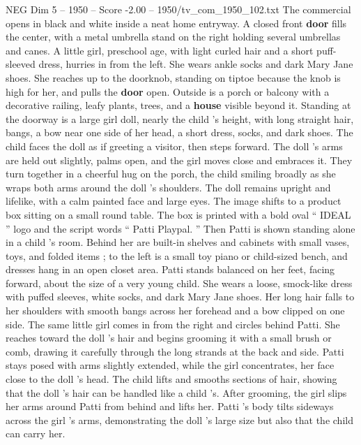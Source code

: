 \begin{textsample}{NEG Dim 5 – 1950 – Score -2.00 – 1950/tv\_com\_1950\_102.txt}  \label{ex:f5_neg_024}
The commercial opens in black and white inside a neat home entryway.
A closed front \textbf{door} fills the center, with a metal umbrella stand on the right holding several umbrellas and canes.
A little girl, preschool age, with light curled hair and a short puff-sleeved dress, hurries in from the left.
She wears ankle socks and dark Mary Jane shoes.
She reaches up to the doorknob, standing on tiptoe because the knob is high for her, and pulls the \textbf{door} open.
Outside is a porch or balcony with a decorative railing, leafy plants, trees, and a \textbf{house} visible beyond it.
Standing at the doorway is a large girl doll, nearly the child ’s height, with long straight hair, bangs, a bow near one side of her head, a short dress, socks, and dark shoes.
The child faces the doll as if greeting a visitor, then steps forward.
The doll ’s arms are held out slightly, palms open, and the girl moves close and embraces it.
They turn together in a cheerful hug on the porch, the child smiling broadly as she wraps both arms around the doll ’s shoulders.
The doll remains upright and lifelike, with a calm painted face and large eyes.
The image shifts to a product box sitting on a small round table.
The box is printed with a bold oval “ IDEAL ” logo and the script words “ Patti Playpal. ” Then Patti is shown standing alone in a child ’s room.
Behind her are built-in shelves and cabinets with small vases, toys, and folded items ; to the left is a small toy piano or child-sized bench, and dresses hang in an open closet area.
Patti stands balanced on her feet, facing forward, about the size of a very young child.
She wears a loose, smock-like dress with puffed sleeves, white socks, and dark Mary Jane shoes.
Her long hair falls to her shoulders with smooth bangs across her forehead and a bow clipped on one side.
The same little girl comes in from the right and circles behind Patti.
She reaches toward the doll ’s hair and begins grooming it with a small brush or comb, drawing it carefully through the long strands at the back and side.
Patti stays posed with arms slightly extended, while the girl concentrates, her face close to the doll ’s head.
The child lifts and smooths sections of hair, showing that the doll ’s hair can be handled like a child ’s.
After grooming, the girl slips her arms around Patti from behind and lifts her.
Patti ’s body tilts sideways across the girl ’s arms, demonstrating the doll ’s large size but also that the child can carry her.

\end{textsample}
